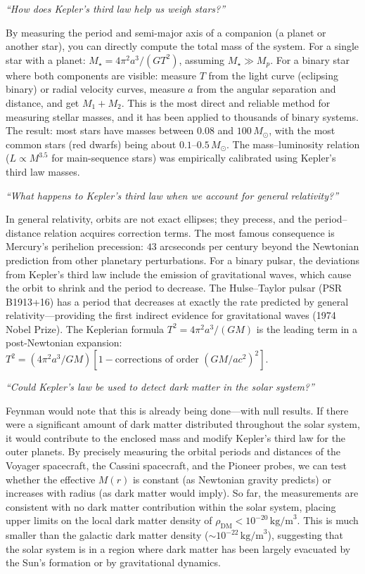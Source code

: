 \documentclass[11pt,openright]{book}
\begin{document}
\textit{``How does Kepler's third law help us weigh stars?''}

By measuring the period and semi-major axis of a companion (a planet or another star), you can directly compute the total mass of the system. For a single star with a planet: $M_\star = 4\pi^2 a^3/(GT^2)$, assuming $M_\star \gg M_p$. For a binary star where both components are visible: measure $T$ from the light curve (eclipsing binary) or radial velocity curves, measure $a$ from the angular separation and distance, and get $M_1 + M_2$. This is the most direct and reliable method for measuring stellar masses, and it has been applied to thousands of binary systems. The result: most stars have masses between $0.08$ and $100\,M_\odot$, with the most common stars (red dwarfs) being about $0.1$--$0.5\,M_\odot$. The mass--luminosity relation ($L \propto M^{3.5}$ for main-sequence stars) was empirically calibrated using Kepler's third law masses.

\textit{``What happens to Kepler's third law when we account for general relativity?''}

In general relativity, orbits are not exact ellipses; they precess, and the period--distance relation acquires correction terms. The most famous consequence is Mercury's perihelion precession: $43$ arcseconds per century beyond the Newtonian prediction from other planetary perturbations. For a binary pulsar, the deviations from Kepler's third law include the emission of gravitational waves, which cause the orbit to shrink and the period to decrease. The Hulse--Taylor pulsar (PSR B1913+16) has a period that decreases at exactly the rate predicted by general relativity---providing the first indirect evidence for gravitational waves (1974 Nobel Prize). The Keplerian formula $T^2 = 4\pi^2 a^3/(GM)$ is the leading term in a post-Newtonian expansion: $T^2 = (4\pi^2 a^3/GM)[1 - \text{corrections of order $(GM/ac^2)^2$}]$.

\textit{``Could Kepler's law be used to detect dark matter in the solar system?''}

Feynman would note that this is already being done---with null results. If there were a significant amount of dark matter distributed throughout the solar system, it would contribute to the enclosed mass and modify Kepler's third law for the outer planets. By precisely measuring the orbital periods and distances of the Voyager spacecraft, the Cassini spacecraft, and the Pioneer probes, we can test whether the effective $M(r)$ is constant (as Newtonian gravity predicts) or increases with radius (as dark matter would imply). So far, the measurements are consistent with no dark matter contribution within the solar system, placing upper limits on the local dark matter density of $\rho_{\text{DM}} < 10^{-20}\,\text{kg/m}^3$. This is much smaller than the galactic dark matter density ($\sim 10^{-22}\,\text{kg/m}^3$), suggesting that the solar system is in a region where dark matter has been largely evacuated by the Sun's formation or by gravitational dynamics.
\end{document}
